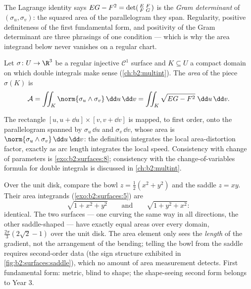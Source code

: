 \begin{remark}
The Lagrange identity says $EG - F^2 = \det\begin{psmallmatrix}
E & F\\ F & G\end{psmallmatrix}$ is the \emph{Gram
determinant} of $(\sigma_u, \sigma_v)$: the squared area of
the parallelogram they span. Regularity, positive
definiteness of the first fundamental form, and positivity of
the Gram determinant are three phrasings of one condition ---
which is why the area integrand below never vanishes on a
regular chart.
\end{remark}

\begin{definition}[Area]\label{def:b2:surfaces:area}
Let $\sigma \colon U \to \R^3$ be a regular injective
$\mathcal{C}^1$ surface and $K \subseteq U$ a compact domain on
which double integrals make sense (\cref{ch:b2:multint}). The
\emph{area} of the piece $\sigma(K)$ is
\[
\mathcal{A}
= \iint_K \norm{\sigma_u \wedge \sigma_v}\,\dd u\,\dd v
= \iint_K \sqrt{EG - F^2}\;\dd u\,\dd v .
\]
\end{definition}

\begin{remark}
The rectangle $[u, u + \dd u] \times [v, v + \dd v]$ is mapped, to
first order, onto the parallelogram spanned by $\sigma_u\,\dd u$
and $\sigma_v\,\dd v$, whose area is $\norm{\sigma_u \wedge
\sigma_v}\,\dd u\,\dd v$: the definition integrates the local
area-distortion factor, exactly as arc length integrates the local
speed. Consistency with change of parameters is
\cref{exo:b2:surfaces:8}; consistency with the change-of-variables
formula for double integrals is discussed in
\cref{ch:b2:multint}.
\end{remark}

\begin{example}\label{ex:b2:surfaces:samearea}
Over the unit disk, compare the bowl $z = \frac12(x^2 + y^2)$
and the saddle $z = xy$. Their area integrands
(\cref{exo:b2:surfaces:5}) are
\[
\sqrt{1 + x^2 + y^2}
\qquad\text{and}\qquad
\sqrt{1 + y^2 + x^2} :
\]
identical. The two surfaces --- one curving the same way in
all directions, the other saddle-shaped --- have exactly
equal areas over every domain, $\frac{2\pi}3(2\sqrt2 - 1)$
over the unit disk. The area element only sees the
\emph{length} of the gradient, not the arrangement of the
bending; telling the bowl from the saddle requires
second-order data (the sign structure exhibited in
\cref{fig:b2:surfaces:saddle}), which no amount of area
measurement detects. First fundamental form: metric, blind
to shape; the shape-seeing second form belongs to Year 3.
\end{example}


